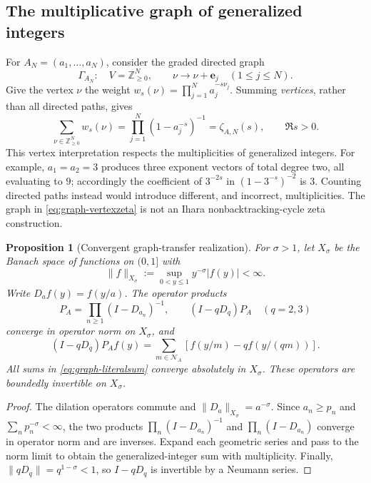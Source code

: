 \documentclass[12pt,letterpaper]{article}
\newtheorem{proposition}[theorem]{Proposition}
\numberwithin{equation}{section}
\theoremstyle{remark}
\begin{document}
\subsection{The multiplicative graph of generalized integers}

For \(A_N=(a_1,\ldots,a_N)\), consider the graded directed graph
\[
 \Gamma_{A_N}:\quad
 V=\mathbb Z_{\ge0}^{N},\qquad
 \nu\longrightarrow \nu+\mathbf e_j\quad(1\le j\le N).
\]
Give the vertex \(\nu\) the weight
\(w_s(\nu)=\prod_{j=1}^N a_j^{-s\nu_j}\).
Summing \emph{vertices}, rather than all directed paths, gives
\begin{equation}\label{eq:graph-vertexzeta}
 \sum_{\nu\in\mathbb Z_{\ge0}^N}w_s(\nu)
 =\prod_{j=1}^N(1-a_j^{-s})^{-1}
 =\zeta_{A,N}(s),\qquad\Re s>0.
\end{equation}
This vertex interpretation respects the multiplicities of
generalized integers.  For example, \(a_1=a_2=3\) produces
three exponent vectors of total degree two, all evaluating to \(9\);
accordingly the coefficient of \(3^{-2s}\) in
\((1-3^{-s})^{-2}\) is \(3\).  Counting directed paths instead
would introduce different, and incorrect, multiplicities.
The graph in \eqref{eq:graph-vertexzeta} is not an Ihara
nonbacktracking-cycle zeta construction.

\begin{proposition}[Convergent graph-transfer realization]
\label{prop:graph-transfer}
For \(\sigma>1\), let \(X_\sigma\) be the Banach space of functions
on \((0,1]\) with
\[
 \|f\|_{X_\sigma}:=\sup_{0<y\le1}y^{-\sigma}|f(y)|<\infty.
\]
Write \(D_a f(y)=f(y/a)\).  The operator products
\begin{equation}\label{eq:graph-resolvents}
 P_A=\prod_{n\ge1}(I-D_{a_n})^{-1},
 \qquad
 (I-qD_q)P_A\quad(q=2,3)
\end{equation}
converge in operator norm on \(X_\sigma\), and
\begin{equation}\label{eq:graph-literalsum}
 (I-qD_q)P_Af(y)
 =\sum_{m\in\mathcal N_A}
 \left[f(y/m)-qf(y/(qm))\right].
\end{equation}
All sums in \eqref{eq:graph-literalsum} converge absolutely in
\(X_\sigma\).  These operators are boundedly invertible on
\(X_\sigma\).
\end{proposition}
\begin{proof}
The dilation operators commute and
\(\|D_a\|_{X_\sigma}=a^{-\sigma}\).
Since \(a_n\ge p_n\) and
\(\sum_n p_n^{-\sigma}<\infty\), the two products
\(\prod_n(I-D_{a_n})^{-1}\) and
\(\prod_n(I-D_{a_n})\) converge in operator norm and
are inverses.  Expand each geometric series and pass to the
norm limit to obtain the generalized-integer sum with
multiplicity.  Finally,
\(\|qD_q\|=q^{1-\sigma}<1\), so \(I-qD_q\) is invertible
by a Neumann series.
\end{proof}
\end{document}
